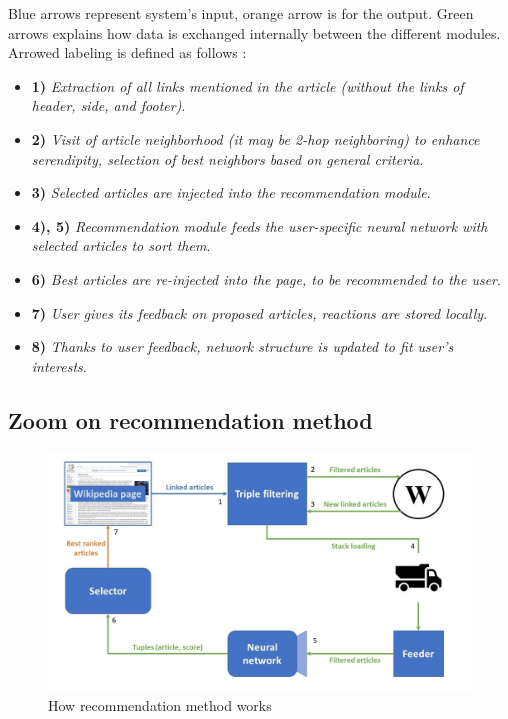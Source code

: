 \documentclass[11pt]{article}
\theoremstyle{plain}
\theoremstyle{definition}
\theoremstyle{remark}
\begin{document}
Blue arrows represent system's input, orange arrow is for the output. Green arrows explains how data is exchanged internally between the different modules. Arrowed labeling is defined as follows :
\begin{itemize}
\item \textbf{1)} \textit{Extraction of all links mentioned in the article (without the links of header, side, and footer)}.
\item \textbf{2)} \textit{Visit of article neighborhood (it may be 2-hop neighboring) to enhance serendipity, selection of best neighbors based on general criteria}.
\item \textbf{3)} \textit{Selected articles are injected into the recommendation module}.
\item \textbf{4), 5)} \textit{Recommendation module feeds the user-specific neural network with selected articles to sort them}.
\item \textbf{6)} \textit{Best articles are re-injected into the page, to be recommended to the user}.
\item \textbf{7)} \textit{User gives its feedback on proposed articles, reactions are stored locally}.
\item \textbf{8)} \textit{Thanks to user feedback, network structure is updated to fit user's interests}.
\end{itemize}

\subsection{Zoom on recommendation method}

\begin{figure}[h!]
	\centering
    \includegraphics[width=400pt]{diagram_zoom.png}
    \caption{How recommendation method works}
    \label{arch_glo}
\end{figure}
\end{document}
